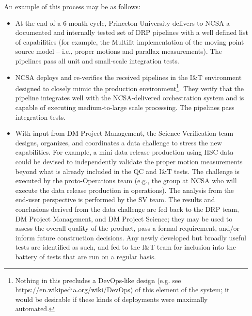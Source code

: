 An example of this process may be as follows:

\begin{itemize}

\item At the end of a 6-month cycle, Princeton University delivers to NCSA a
documented and internally tested set of DRP pipelines with a well defined
list of capabilities (for example, the Multifit implementation of the
moving point source model -- i.e., proper motions and parallax measurements).
The pipelines pass all unit and small-scale integration tests.

\item NCSA deploys and re-verifies the received pipelines in the I\&T
environment designed to closely mimic the production
environment\footnote{Nothing in this precludes a
DevOps-like design (e.g. see https://en.wikipedia.org/wiki/DevOps) of this
element of the system; it would be desirable if these kinds of deployments
were maximally automated.}. They verify that the pipeline integrates well
with the NCSA-delivered orchestration system and is capable of executing
medium-to-large scale processing. The pipelines pass integration tests.

\item With input from DM Project Management, the Science Verification team
designs, organizes, and coordinates a data challenge to stress the new
capabilities.  For example, a mini data release production using HSC data
could be devised to independently validate the proper motion measurements
beyond what is already included in the QC and I\&T tests.  The challenge is
executed by the proto-Operations team (e.g., the group at NCSA who will
execute the data release production in operations).  The analysis from the
end-user perspective is performed by the SV team.  The results and
conclusions derived from the data challenge are fed back to the DRP team, DM
Project Management, and DM Project Science; they may be used to assess the
overall quality of the product, pass a formal requirement, and/or inform
future construction decisions.  Any newly developed but broadly useful
tests are identified as such, and fed to the I\&T team for inclusion into the
battery of tests that are run on a regular basis.

\end{itemize}

